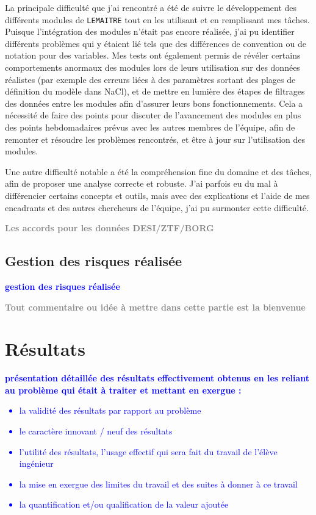 \documentclass{book}
\newcommand{\todo}[1]{{\textcolor{gray}{\bf \large #1}}}
\newcommand{\consignes}[1]{{\textcolor{blue}{\bf \large #1}}}
\def\lemaitre{\texttt{LEMAITRE}\xspace}
\begin{document}
La principale difficulté que j'ai rencontré a été de suivre le développement des différents modules de \lemaitre tout en les utilisant et en remplissant mes tâches. Puisque l'intégration des modules n'était pas encore réalisée, j'ai pu identifier différents problèmes qui y étaient lié tels que des différences de convention ou de notation pour des variables. Mes tests ont également permis de révéler certains comportements anormaux des modules lors de leurs utilisation sur des données réalistes (par exemple des erreurs liées à des paramètres sortant des plages de définition du modèle dans NaCl), et de mettre en lumière des étapes de filtrages des données entre les modules afin d'assurer leurs bons fonctionnements. Cela a nécessité de faire des points pour discuter de l'avancement des modules en plus des points hebdomadaires prévus avec les autres membres de l'équipe, afin de remonter et résoudre les problèmes rencontrés, et être à jour sur l'utilisation des modules.

Une autre difficulté notable a été la compréhension fine du domaine et des tâches, afin de proposer une analyse correcte et robuste. J'ai parfois eu du mal à différencier certains concepts et outils, mais avec des explications et l'aide de mes encadrants et des autres chercheurs de l'équipe, j'ai pu surmonter cette difficulté.


\todo{Les accords pour les données DESI/ZTF/BORG}


\section{Gestion des risques réalisée}
\consignes{gestion des risques réalisée}

\todo{Tout commentaire ou idée à mettre dans cette partie est la bienvenue}



\chapter{Résultats}
\consignes{présentation détaillée des résultats effectivement obtenus en les reliant au problème qui était à traiter et mettant en exergue :
\begin{itemize}
\item la validité des résultats par rapport au problème
\item le caractère innovant / neuf des résultats
\item l’utilité des résultats, l’usage effectif qui sera fait du travail de l’élève ingénieur
\item la mise en exergue des limites du travail et des suites à donner à ce travail
\item la quantification et/ou qualification de la valeur ajoutée
\end{itemize}}
\end{document}
